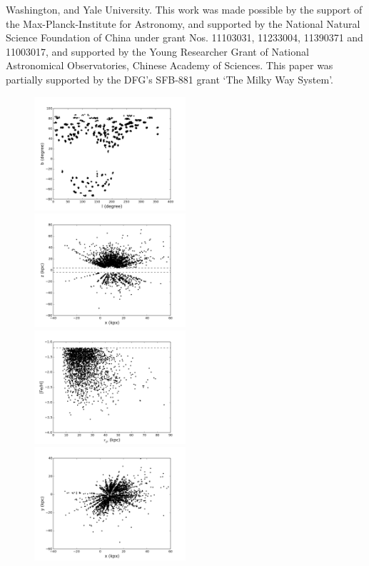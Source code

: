 \documentclass[12pt,preprint]{aastex}
\begin{document}
Washington, and Yale University.
This work was made possible by the support of the Max-Planck-Institute
for Astronomy, and supported by the National Natural Science
Foundation of China under grant Nos. 11103031, 11233004, 11390371 and 11003017,
and supported by the Young Researcher Grant of National Astronomical
Observatories, Chinese Academy of Sciences. This paper was partially
supported by the DFG's SFB-881 grant `The Milky Way System'.


\clearpage
\begin{figure}
\includegraphics[width=0.5\textwidth,height=0.3\textheight]{skymap_lkg}
\includegraphics[width=0.5\textwidth,height=0.3\textheight]{xz_lkg}
\includegraphics[width=0.5\textwidth,height=0.3\textheight]{rgcfeh_lkg}
\includegraphics[width=0.5\textwidth,height=0.3\textheight]{xy_lkg}

\end{figure}
\end{document}
